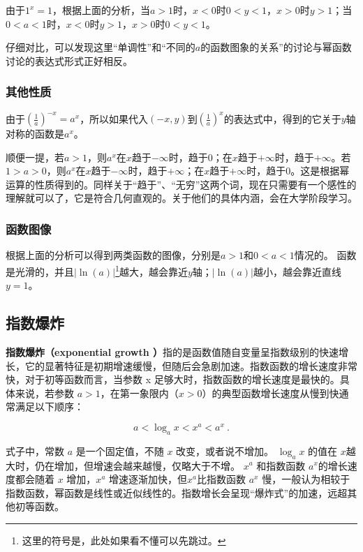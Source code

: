 由于$1^x=1$，根据上面的分析，当$a>1$时，$x<0$时$0<y<1$，$x>0$时$y>1$；当$0<a<1$时，$x<0$时$y>1$，$x>0$时$0<y<1$。

仔细对比，可以发现这里“单调性”和“不同的$a$的函数图象的关系”的讨论与幂函数讨论的表达式形式正好相反。

\subsubsection{其他性质}

由于$\displaystyle \left(\frac{1}{a}\right)^{-x}=a^{x}$，所以如果代入$(-x,y)$到$\displaystyle\left(\frac{1}{a}\right)^{x}$的表达式中，得到的它关于$y$轴对称的函数是$a^{x}$。

顺便一提，若$a>1$，则$a^x$在$x$趋于$-\infty$时，趋于$0$；在$x$趋于$+\infty$时，趋于$+\infty$。若$1>a>0$，则$a^x$在$x$趋于$-\infty$时，趋于$+\infty$；在$x$趋于$+\infty$时，趋于$0$。这是根据幂运算的性质得到的。同样关于“趋于”、“无穷”这两个词，现在只需要有一个感性的理解就可以了，它是符合几何直观的。关于他们的具体内涵，会在大学阶段学习。

\subsubsection{函数图像}

根据上面的分析可以得到两类函数的图像，分别是$a>1$和$0<a<1$情况的。
函数是光滑的，并且$|\ln(a)|$\footnote{这里的符号是，此处如果看不懂可以先跳过。}越大，越会靠近$y$轴；$|\ln(a)|$越小，越会靠近直线$y=1$。

\subsection{指数爆炸}

\textbf{指数爆炸（exponential growth ）}指的是函数值随自变量呈指数级别的快速增长，它的显著特征是初期增速缓慢，但随后会急剧加速。指数函数的增长速度非常快，对于初等函数而言，当参数 x 足够大时，指数函数的增长速度是最快的。具体来说，若参数 $a > 1$，在第一象限内（$x > 0$）的典型函数增长速度从慢到快通常满足以下顺序：

\begin{equation}
 a < \log_a{x} <x^a < a^x~.
\end{equation}

式子中，常数 $a$ 是一个固定值，不随 $x$ 改变，或者说不增加。 $\log_a{x}$ 的值在 $x$越大时，仍在增加，但增速会越来越慢，仅略大于不增。 $x^a$ 和指数函数 $a^x$的增长速度都会随着 $x$ 增加，$x^a$ 增速逐渐加快，但$x^a$比指数函数 $a^x$ 慢，一般认为相较于指数函数，幂函数是线性或近似线性的。指数增长会呈现“爆炸式”的加速，远超其他初等函数。

